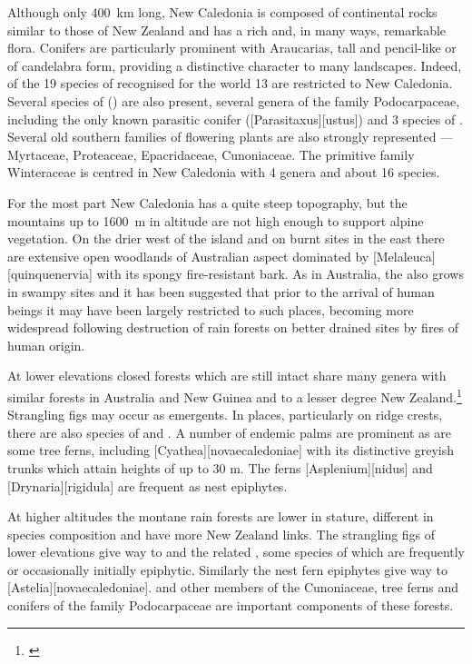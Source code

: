 Although only \SI{400}{\kilo\metre} long, New Caledonia is composed of continental rocks similar to those of New Zealand and has a rich and, in many ways, remarkable flora.
Conifers are particularly prominent with Araucarias, tall and pencil-like or of candelabra form, providing a distinctive character to many landscapes.
Indeed, of the 19 species of  recognised for the world 13 are restricted to New Caledonia.
Several species of  () are also present, several genera of the family Podocarpaceae, including the only known parasitic conifer ([Parasitaxus][ustus]) and 3 species of .
Several old southern families of flowering plants are also strongly represented --- Myrtaceae, Proteaceae, Epacridaceae, Cunoniaceae.
The primitive family Winteraceae is centred in New Caledonia with 4 genera and about 16 species.

For the most part New Caledonia has a quite steep topography, but the mountains up to \SI{1600}{\metre} in altitude are not high enough to support alpine vegetation.
On the drier west of the island and on burnt sites in the east there are extensive open woodlands of Australian aspect dominated by [Melaleuca][quinquenervia] with its spongy fire-resistant bark.
As in Australia, the  also grows in swampy sites and it has been suggested that prior to the arrival of human beings it may have been largely restricted to such places, becoming more widespread following destruction of rain forests on better drained sites by fires of human origin.

At lower elevations closed forests which are still intact share many genera with similar forests in Australia and New Guinea and to a lesser degree New Zealand.\footnote{\cite{morat1986floristic}}
Strangling figs may occur as emergents.
In places, particularly on ridge crests, there are also species of  and .
A number of endemic palms are prominent as are some tree ferns, including [Cyathea][novaecaledoniae] with its distinctive greyish trunks which attain heights of up to 30 m.
The ferns [Asplenium][nidus] and [Drynaria][rigidula] are frequent as nest epiphytes.

At higher altitudes the montane rain forests are lower in stature, different in species composition and have more New Zealand links.
The strangling figs of lower elevations give way to  and the related , some species of which are frequently or occasionally initially epiphytic.
Similarly the nest fern epiphytes give way to [Astelia][novaecaledoniae].
 and other members of the Cunoniaceae, tree ferns and conifers of the family Podocarpaceae are important components of these forests.

